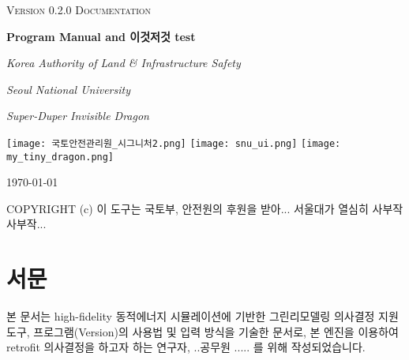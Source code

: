 \documentclass[oneside,openany,a4paper,12pt]{book}
\begin{document}
\pagestyle{plain} 


\listoftodos

\begin{titlepage}
  \centering
  {\scshape\large \simulator Version 0.2.0 Documentation\par}
  \vspace{6em}
  {\bfseries\Huge Program Manual and 이것저것 test\par}
  \vspace{1em}
  {\itshape\Large Korea Authority of Land \& Infrastructure Safety\par}
  {\itshape\Large Seoul National University\par}
  {\itshape\Large Super-Duper Invisible Dragon\par}
  \vfill
  \texttt{[image: 국토안전관리원\_시그니처2.png]}
  \hspace{2em}
  \texttt{[image: snu\_ui.png]}
  \hspace{2em}
  \texttt{[image: my\_tiny\_dragon.png]}
  \vfill
  {\large \today \par}
  \vspace{0.5em}
  {\small COPYRIGHT (c) 이 도구는 국토부, 안전원의 후원을 받아... 서울대가 열심히 사부작 사부작...}
\end{titlepage}

\section*{서문}
본 문서는 high-fidelity 동적에너지 시뮬레이션에 기반한 그린리모델링 의사결정 지원 도구, \simulator 프로그램(Version\simulatorversion)의 사용법 및 입력 방식을 기술한 문서로, 본 엔진을 이용하여 retrofit 의사결정을 하고자 하는 연구자, ..공무원 ..... 를 위해 작성되었습니다.
\end{document}
